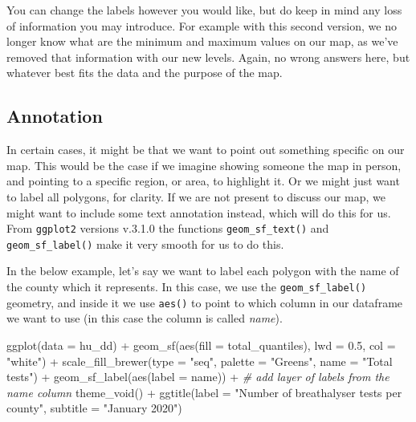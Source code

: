 \documentclass[
]{book}
\newenvironment{Shaded}{\begin{snugshade}}{\end{snugshade}}
\newcommand{\AttributeTok}[1]{\textcolor[rgb]{0.77,0.63,0.00}{#1}}
\newcommand{\CommentTok}[1]{\textcolor[rgb]{0.56,0.35,0.01}{\textit{#1}}}
\newcommand{\FloatTok}[1]{\textcolor[rgb]{0.00,0.00,0.81}{#1}}
\newcommand{\FunctionTok}[1]{\textcolor[rgb]{0.00,0.00,0.00}{#1}}
\newcommand{\NormalTok}[1]{#1}
\newcommand{\SpecialCharTok}[1]{\textcolor[rgb]{0.00,0.00,0.00}{#1}}
\newcommand{\StringTok}[1]{\textcolor[rgb]{0.31,0.60,0.02}{#1}}
\begin{document}
You can change the labels however you would like, but do keep in mind any loss of information you may introduce. For example with this second version, we no longer know what are the minimum and maximum values on our map, as we've removed that information with our new levels. Again, no wrong answers here, but whatever best fits the data and the purpose of the map.

\hypertarget{annotation}{%
\subsection{Annotation}\label{annotation}}

In certain cases, it might be that we want to point out something specific on our map. This would be the case if we imagine showing someone the map in person, and pointing to a specific region, or area, to highlight it. Or we might just want to label all polygons, for clarity. If we are not present to discuss our map, we might want to include some text annotation instead, which will do this for us. From \texttt{ggplot2} versions v.3.1.0 the functions \texttt{geom\_sf\_text()} and \texttt{geom\_sf\_label()} make it very smooth for us to do this.

In the below example, let's say we want to label each polygon with the name of the county which it represents. In this case, we use the \texttt{geom\_sf\_label()} geometry, and inside it we use \texttt{aes()} to point to which column in our dataframe we want to use (in this case the column is called \emph{name}).

\begin{Shaded}
\begin{Highlighting}[]
\FunctionTok{ggplot}\NormalTok{(}\AttributeTok{data =}\NormalTok{ hu\_dd) }\SpecialCharTok{+} 
  \FunctionTok{geom\_sf}\NormalTok{(}\FunctionTok{aes}\NormalTok{(}\AttributeTok{fill =}\NormalTok{ total\_quantiles), }
          \AttributeTok{lwd =} \FloatTok{0.5}\NormalTok{, }\AttributeTok{col =} \StringTok{"white"}\NormalTok{) }\SpecialCharTok{+} 
  \FunctionTok{scale\_fill\_brewer}\NormalTok{(}\AttributeTok{type =} \StringTok{"seq"}\NormalTok{, }
                    \AttributeTok{palette =} \StringTok{"Greens"}\NormalTok{, }
                    \AttributeTok{name =} \StringTok{"Total tests"}\NormalTok{) }\SpecialCharTok{+} 
  \FunctionTok{geom\_sf\_label}\NormalTok{(}\FunctionTok{aes}\NormalTok{(}\AttributeTok{label =}\NormalTok{ name)) }\SpecialCharTok{+}  \CommentTok{\# add layer of labels from the name column}
  \FunctionTok{theme\_void}\NormalTok{() }\SpecialCharTok{+} 
  \FunctionTok{ggtitle}\NormalTok{(}\AttributeTok{label =} \StringTok{"Number of breathalyser tests per county"}\NormalTok{, }
          \AttributeTok{subtitle =} \StringTok{"January 2020"}\NormalTok{)}
\end{Highlighting}
\end{Shaded}
\end{document}
